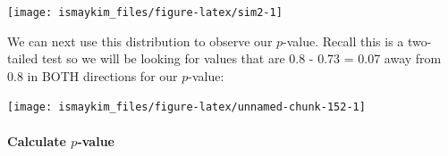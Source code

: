 \documentclass[]{tufte-book}
\newenvironment{Shaded}{\begin{snugshade}}{\end{snugshade}}
\newcommand{\KeywordTok}[1]{\textcolor[rgb]{0.13,0.29,0.53}{\textbf{{#1}}}}
\newcommand{\DataTypeTok}[1]{\textcolor[rgb]{0.13,0.29,0.53}{{#1}}}
\newcommand{\DecValTok}[1]{\textcolor[rgb]{0.00,0.00,0.81}{{#1}}}
\newcommand{\FloatTok}[1]{\textcolor[rgb]{0.00,0.00,0.81}{{#1}}}
\newcommand{\StringTok}[1]{\textcolor[rgb]{0.31,0.60,0.02}{{#1}}}
\newcommand{\NormalTok}[1]{{#1}}
\begin{document}
\begin{Shaded}
\end{Shaded}

\begin{center}\texttt{[image: ismaykim\_files/figure-latex/sim2-1]} \end{center}

We can next use this distribution to observe our \(p\)-value. Recall
this is a two-tailed test so we will be looking for values that are 0.8
- 0.73 = 0.07 away from 0.8 in BOTH directions for our \(p\)-value:

\begin{Shaded}
\end{Shaded}

\begin{center}\texttt{[image: ismaykim\_files/figure-latex/unnamed-chunk-152-1]} \end{center}

\paragraph{\texorpdfstring{Calculate
\(p\)-value}{Calculate p-value}}\label{calculate-p-value-1}
\end{document}
